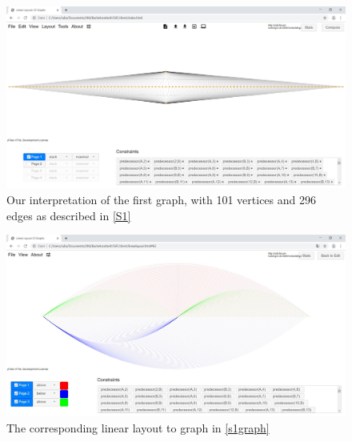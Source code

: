 \begin{figure}[h!]
\begin{center}
\includegraphics[width=1\textwidth]{figures/skeletonGraph101-296.jpg}
\caption{Our interpretation of the first graph, with 101 vertices and 296 edges as described in \autoref{S1}\label{s1graph}}
\end{center}
\end{figure}
\begin{figure}[h!]
\begin{center}
\includegraphics[width=1\textwidth]{figures/skeletonGraph101-296-Solution.jpg}
\caption{The corresponding linear layout to graph in \autoref{s1graph}\label{s1sol}}
\end{center}
\end{figure}

